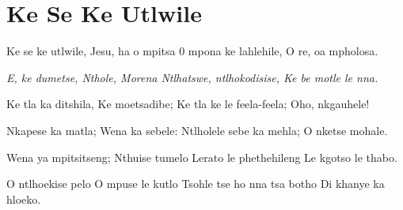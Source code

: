 \starttocol
\chapter{Ke Se Ke Utlwile}
\nexttocol
\hfill{\it }
\stoptocol
\starttocol
\startlines
{\sc Ke} se ke utlwile, 
Jesu, ha o mpitsa 
0 mpona ke lahlehile, 
O re, oa mpholosa.

{\it E, ke dumetse, 
Nthole, Morena 
Ntlhatswe, ntlhokodisise, 
Ke be motle le nna.}

Ke tla ka ditshila,  
Ke moetsadibe; 
Ke tla ke le feela-feela; 
Oho, nkgauhele!

Nkapese ka matla;  
Wena ka sebele:
Ntlholele sebe ka mehla;
O nketse mohale.

Wena ya mpitsitseng; 
Nthuise tumelo
Lerato le phethehileng
Le kgotso le thabo. 

O ntlhoekise pelo
O mpuse le kutlo
Tsohle tse ho nna tsa botho
Di khanye ka hloeko. 
\stoplines
\nexttocol

\stoptocol
